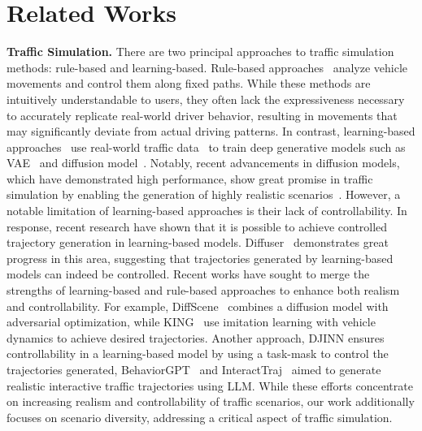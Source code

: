 \section{Related Works}
\noindent
{\bf Traffic Simulation.} There are two principal approaches to traffic simulation methods: rule-based and learning-based. Rule-based approaches~\cite{rulebase1, rulebase2} analyze vehicle movements and control them along fixed paths. While these methods are intuitively understandable to users, they often lack the expressiveness necessary to accurately replicate real-world driver behavior, resulting in movements that may significantly deviate from actual driving patterns. In contrast, learning-based approaches~\cite{learningbase1, learningbase2, learningbase3, trace} use real-world traffic data~\cite{nuscenes} to train deep generative models such as VAE~\cite{vae} and diffusion model~\cite{diffusion}. Notably, recent advancements in diffusion models, which have demonstrated high performance, show great promise in traffic simulation by enabling the generation of highly realistic scenarios~\cite{motiondiffuser, traffcdiffusion1,trafficdiffusion2, trafficdiffusion3}. However, a notable limitation of learning-based approaches is their lack of controllability. In response, recent research have shown that it is possible to achieve controlled trajectory generation in learning-based models. Diffuser~\cite{diffuser} demonstrates great progress in this area, suggesting that trajectories generated by learning-based models can indeed be controlled. Recent works have sought to merge the strengths of learning-based and rule-based approaches to enhance both realism and controllability. For example, DiffScene~\cite{trafficdiffusion4} combines a diffusion model with adversarial optimization, while KING~\cite{king} use imitation learning with vehicle dynamics to achieve desired trajectories. Another approach, DJINN \cite{navigate} ensures controllability in a learning-based model by using a task-mask to control the trajectories generated, BehaviorGPT~\cite{behaviorgpt} and  InteractTraj~\cite{xia2024language} aimed to generate realistic interactive traffic trajectories using LLM. While these efforts concentrate on increasing realism and controllability of traffic scenarios, our work additionally focuses on scenario diversity, addressing a critical aspect of traffic simulation.


